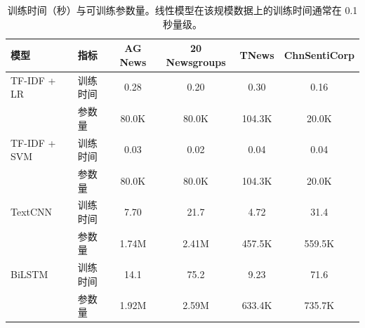 \begin{table}[htbp]
\centering
\caption{训练时间（秒）与可训练参数量。线性模型在该规模数据上的训练时间通常在 0.1 秒量级。}
\label{tab:efficiency}
\small
\begin{tabular}{llcccc}
\toprule
模型 & 指标 & AG News & 20 Newsgroups & TNews & ChnSentiCorp \\
\midrule
TF-IDF + LR & 训练时间 & 0.28 & 0.20 & 0.30 & 0.16 \\
 & 参数量 & 80.0K & 80.0K & 104.3K & 20.0K \\
\midrule
TF-IDF + SVM & 训练时间 & 0.03 & 0.02 & 0.04 & 0.04 \\
 & 参数量 & 80.0K & 80.0K & 104.3K & 20.0K \\
\midrule
TextCNN & 训练时间 & 7.70 & 21.7 & 4.72 & 31.4 \\
 & 参数量 & 1.74M & 2.41M & 457.5K & 559.5K \\
\midrule
BiLSTM & 训练时间 & 14.1 & 75.2 & 9.23 & 71.6 \\
 & 参数量 & 1.92M & 2.59M & 633.4K & 735.7K \\
\bottomrule
\end{tabular}
\end{table}
